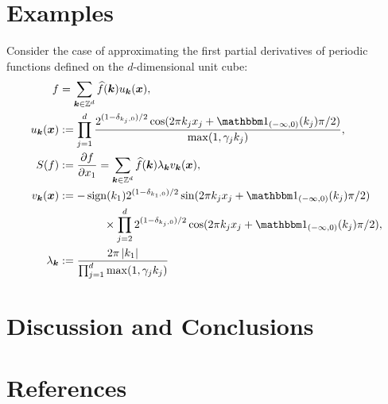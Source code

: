 \documentclass[final]{elsarticle}
\newcommand{\pin}{p_{\text{\rm{in}}}}
\newcommand{\pout}{p_{\text{\rm{out}}}}
\theoremstyle{definition}
\theoremstyle{remark}
\begin{document}
\section{Examples} \label{sec:examp}

Consider the case of approximating the first partial derivatives of periodic functions defined on the $d$-dimensional unit cube:
\begin{align*}
f &= \sum_{\vk \in \integers^d} \hf(\vk) u_{\vk} (\vx), \\
u_{\vk} (\vx) &:= \prod_{j=1}^d \frac{2^{(1-\delta_{k_j,0})/2}\cos(2\pi k_j x_j  + \bbone_{(-\infty,0)}(k_j) \pi/2 )}{\max(1,\gamma_j k_j)},  \\
S(f) &: = \frac{\partial f}{\partial x_1} = \sum_{\vk \in \integers^d} \hf(\vk) \lambda_{\vk} v_{\vk} (\vx), \\
v_{\vk}(\vx) & : =  -\sign(k_1) 2^{(1-\delta_{k_1,0})/2} \sin(2\pi k_j x_j  + \bbone_{(-\infty,0)}(k_j) \pi/2 ) \\
& \qquad \qquad \times \prod_{j=2}^d 2^{(1-\delta_{k_j,0})/2} \cos(2\pi k_j x_j  + \bbone_{(-\infty,0)}(k_j) \pi/2 ), \\
\lambda_{\vk} &:= \frac{2 \pi \abs{k_1}}{\prod_{j=1}^d\max(1,\gamma_j k_j)}
\end{align*}




%
%

\section{Discussion and Conclusions} \label{sec:conc}

\section*{References}


\end{document}
